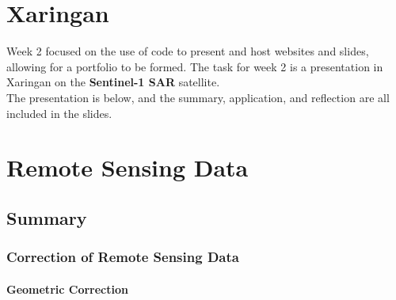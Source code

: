 \documentclass[
  letterpaper,
]{scrbook}
\begin{document}

\chapter{Xaringan}\label{xaringan}

Week 2 focused on the use of code to present and host websites and
slides, allowing for a portfolio to be formed. The task for week 2 is a
presentation in Xaringan on the \textbf{Sentinel-1 SAR} satellite.\\
The presentation is below, and the summary, application, and reflection
are all included in the slides.


\chapter{Remote Sensing Data}\label{remote-sensing-data}

\section{Summary}\label{summary-1}

\subsection{Correction of Remote Sensing
Data}\label{correction-of-remote-sensing-data}

\subsubsection{Geometric Correction}\label{geometric-correction}
\end{document}
